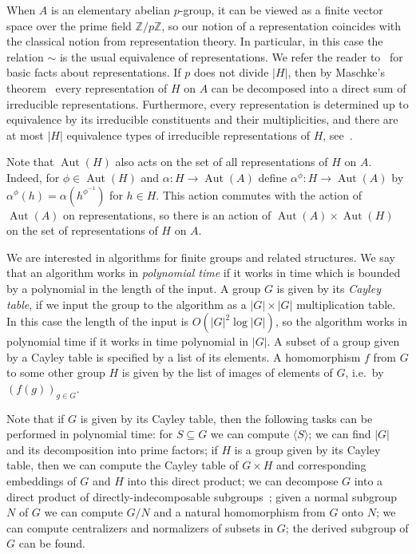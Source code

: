 \documentclass{article}
\DeclareMathOperator{\Aut}{Aut}
\begin{document}
When \( A \) is an elementary abelian \( p \)-group, it can be viewed as a finite vector space over the prime field \( \mathbb{Z}/p\mathbb{Z} \),
so our notion of a representation coincides with the classical notion from representation theory.
In particular, in this case the relation \( \sim \) is the usual equivalence of representations.
We refer the reader to~\cite[Chapter~3]{gorenstein} for basic facts about representations.
If \( p \) does not divide \( |H| \), then by Maschke's theorem~\cite[Theorem~3.3.1]{gorenstein} every representation of \( H \) on \( A \) can be decomposed
into a direct sum of irreducible representations. Furthermore, every representation is determined up to equivalence by
its irreducible constituents and their multiplicities, and there are at most \( |H| \) equivalence types of
irreducible representations of \( H \), see~\cite[Theorem~3.6.14]{gorenstein}.

Note that \( \Aut(H) \) also acts on the set of all representations of \( H \) on \( A \).
Indeed, for \( \phi \in \Aut(H) \) and \( \alpha : H \to \Aut(A) \) define \( \alpha^\phi : H \to \Aut(A) \)
by \( \alpha^\phi(h) = \alpha(h^{\phi^{-1}}) \) for \( h \in H \).
This action commutes with the action of \( \Aut(A) \) on representations, so there is an action of \( \Aut(A) \times \Aut(H) \)
on the set of representations of \( H \) on \( A \).

We are interested in algorithms for finite groups and related structures.
We say that an algorithm works in \emph{polynomial time} if it works in time which is bounded by a polynomial
in the length of the input. A group \( G \) is given by its \emph{Cayley table}, if we input the group to the algorithm
as a \( |G| \times |G| \) multiplication table. In this case the length of the input is \( O(|G|^2 \log |G|) \),
so the algorithm works in polynomial time if it works in time polynomial in \( |G| \).
A subset of a group given by a Cayley table is specified by a list of its elements.
A homomorphism \( f \) from \( G \) to some other group \( H \) is given by the list of images of elements of \( G \),
i.e.\ by \( (f(g))_{g \in G} \).

Note that if \( G \) is given by its Cayley table, then the following tasks can be performed in polynomial time:
for \( S \subseteq G \) we can compute \( \langle S \rangle \); we can find \( |G| \) and its decomposition into prime factors;
if \( H \) is a group given by its Cayley table, then we can compute the Cayley table of \( G \times H \) and corresponding embeddings
of \( G \) and \( H \) into this direct product; we can decompose \( G \) into a direct product of directly-indecomposable subgroups~\cite{kayal};
given a normal subgroup \( N \) of \( G \) we can compute \( G/N \) and a natural homomorphism from \( G \) onto \( N \);
we can compute centralizers and normalizers of subsets in \( G \); the derived subgroup of \( G \) can be found.
\end{document}
